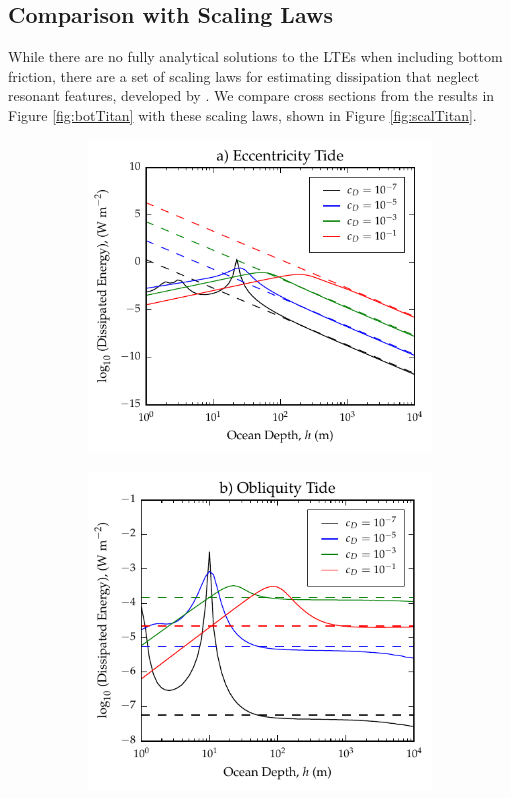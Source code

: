 \subsection{Comparison with Scaling Laws \label{subsec:scalTitan}}

While there are no fully analytical solutions to the LTEs when including bottom friction, there are a set of scaling laws for estimating dissipation that neglect resonant features, developed by \citet{chen2013tidal}. We compare cross sections from the results in Figure \ref{fig:botTitan} with these scaling laws, shown in Figure \ref{fig:scalTitan}.

\begin{figure}[!t]
\centering
\begin{subfigure}{0.4\linewidth}
\centering
\includegraphics[width=\linewidth]{Figures/Eccentricity_scaling}
\subcaption{\label{fig:scalEccTitan}}
\end{subfigure}%
\begin{subfigure}{0.4\linewidth}
\centering
\includegraphics[width=\linewidth]{Figures/Obliquity_scaling}

\end{subfigure}
\end{figure}
